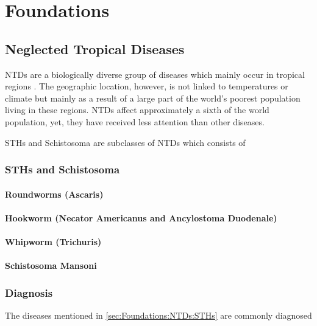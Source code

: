 \chapter{Foundations}
\label{ch:Foundations}

\section{Neglected Tropical Diseases}
\label{sec:Foundations:NTDs}

\ac{NTDs} are a biologically diverse group of diseases which mainly occur in tropical regions \cite{feasey2010neglected}. The geographic location, however, is not linked to temperatures or climate but mainly as a result of a large part of the world's poorest population living in these regions. \ac{NTDs} affect approximately a sixth of the world population, yet, they have received less attention than other diseases.

\ac{STHs} and Schistosoma are subclasses of \ac{NTDs} which consists of 

\subsection{\acl{STHs} and Schistosoma}


\label{sec:Foundations:NTDs:STHs}

\subsubsection{Roundworms (Ascaris)}
\label{sec:Foundations:NTDs:STHs:Ascaris}

\subsubsection{Hookworm (Necator Americanus and Ancylostoma Duodenale)}
\label{sec:Foundations:NTDs:STHs:Hookworm}

\subsubsection{Whipworm (Trichuris)}
\label{sec:Foundations:NTDs:STHs:Whipworm}

\subsubsection{Schistosoma Mansoni}
\label{sec:Foundations:NTDs:STHs:Schistosoma}

\subsection{Diagnosis}
\label{sec:Foundations:NTDs:Diagnosis}

The diseases mentioned in \autoref{sec:Foundations:NTDs:STHs} are commonly diagnosed 
